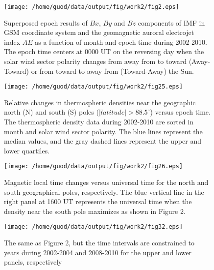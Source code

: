 \documentclass[draft,grl]{/home/guod/Documents/template/agu_template/AGUTeX}
\begin{document}
\begin{figure}
    \centering
    \noindent\texttt{[image: /home/guod/data/output/fig/work2/fig2.eps]}
    \caption{Superposed epoch results of $Bx$, $By$ and $Bz$ components of IMF in GSM coordinate system and the
    geomagnetic auroral electrojet index $AE$ as a function of month and epoch time during 2002-2010. The epoch 
    time centers at 0000 UT on the reversing day when the solar wind sector polarity changes from away from to 
    toward (Away-Toward) or from toward to away from (Toward-Away) the Sun. }
    \label{figure1}
\end{figure}
\begin{figure}
    \centering
    \noindent\texttt{[image: /home/guod/data/output/fig/work2/fig25.eps]}
    \caption{Relative changes in thermospheric densities near the geographic north (N) and south (S) poles 
    ($\left|latitude\right| > 88.5^\circ$) versus epoch time. The thermospheric density data during 2002-2010 
    are sorted in month and solar wind sector polarity. The blue lines represent the median values, and the 
    gray dashed lines represent the upper and lower quartiles.}
    \label{figure2}
\end{figure}
\begin{figure}
    \centering
    \noindent\texttt{[image: /home/guod/data/output/fig/work2/fig26.eps]}
    \caption{ Magnetic local time changes versus universal time for the north and south geographical poles, 
    respectively. The blue vertical line in the right panel at 1600 UT represents the universal time when 
    the density near the south pole maximizes as shown in Figure 2.}
    \label{figure3}
\end{figure}
\begin{figure}
    \centering
    \noindent\texttt{[image: /home/guod/data/output/fig/work2/fig32.eps]}
    \caption{The same as Figure 2, but the time intervals are constrained to years during 2002-2004 
    and 2008-2010 for the upper and lower panels, respectively}
    \label{figure4}
\end{figure}

\end{document}
